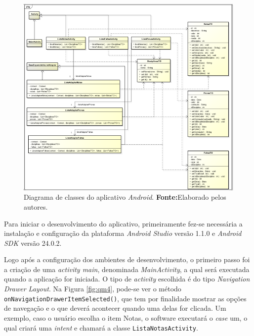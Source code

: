 		\pagebreak
		\begin{figure}[h!]
			\centerline{\includegraphics[scale=0.4]{./imagens/2_q_metodologico/qm7(1).png}}
			\caption[Diagrama de classes do aplicativo \textit{Android}]{Diagrama de
			classes do aplicativo \textit{Android}.
			 \textbf{Fonte:}Elaborado pelos autores.}
			\label{fig:qm7(1)}
		\end{figure}
		
	
	\par Para iniciar o desenvolvimento do aplicativo, primeiramente fez-se
necessária a instalação e configuração da plataforma \textit{Android Studio}
versão 1.1.0 e \textit{Android SDK} versão 24.0.2.

	\par Logo após a configuração dos ambientes de desenvolvimento, o primeiro
passo foi a criação de uma \textit{activity main}, denominada
\textit{MainActivity}, a qual será executada quando a aplicação for iniciada. O
tipo de \textit{activity} escolhida é do tipo \textit{Navigation Drawer
Layout}. Na Figura \ref{fig:qm4}, pode-se ver o método
\texttt{onNavigationDrawerItemSelected()}, que tem por finalidade mostrar as
opções de navegação e o que deverá acontecer quando uma delas for clicada. Um
exemplo, caso o usuário escolha o item Notas, o software executará o
\textit{case} um, o qual criará uma \textit{intent} e chamará a classe
\texttt{ListaNotasActivity}.
	
